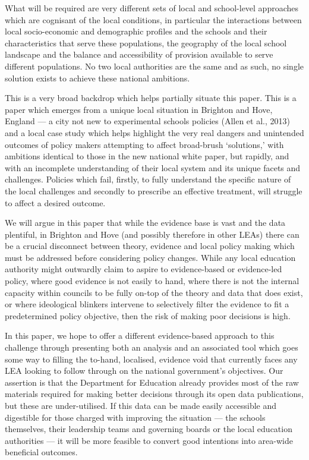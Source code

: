 \documentclass[
  11pt,
]{article}
\begin{document}
What will be required are very different sets of local and school-level
approaches which are cognisant of the local conditions, in particular
the interactions between local socio-economic and demographic profiles
and the schools and their characteristics that serve these populations,
the geography of the local school landscape and the balance and
accessibility of provision available to serve different populations. No
two local authorities are the same and as such, no single solution
exists to achieve these national ambitions.

This is a very broad backdrop which helps partially situate this paper.
This is a paper which emerges from a unique local situation in Brighton
and Hove, England --- a city not new to experimental schools policies
(Allen et al., 2013) and a local case study which helps highlight the
very real dangers and unintended outcomes of policy makers attempting to
affect broad-brush `solutions,' with ambitions identical to those in the
new national white paper, but rapidly, and with an incomplete
understanding of their local system and its unique facets and
challenges. Policies which fail, firstly, to fully understand the
specific nature of the local challenges and secondly to prescribe an
effective treatment, will struggle to affect a desired outcome.

We will argue in this paper that while the evidence base is vast and the
data plentiful, in Brighton and Hove (and possibly therefore in other
LEAs) there can be a crucial disconnect between theory, evidence and
local policy making which must be addressed before considering policy
changes. While any local education authority might outwardly claim to
aspire to evidence-based or evidence-led policy, where good evidence is
not easily to hand, where there is not the internal capacity within
councils to be fully on-top of the theory and data that does exist, or
where ideological blinkers intervene to selectively filter the evidence
to fit a predetermined policy objective, then the risk of making poor
decisions is high.

In this paper, we hope to offer a different evidence-based approach to
this challenge through presenting both an analysis and an associated
tool which goes some way to filling the to-hand, localised, evidence
void that currently faces any LEA looking to follow through on the
national government's objectives. Our assertion is that the Department
for Education already provides most of the raw materials required for
making better decisions through its open data publications, but these
are under-utilised. If this data can be made easily accessible and
digestible for those charged with improving the situation --- the
schools themselves, their leadership teams and governing boards or the
local education authorities --- it will be more feasible to convert good
intentions into area-wide beneficial outcomes.
\end{document}

